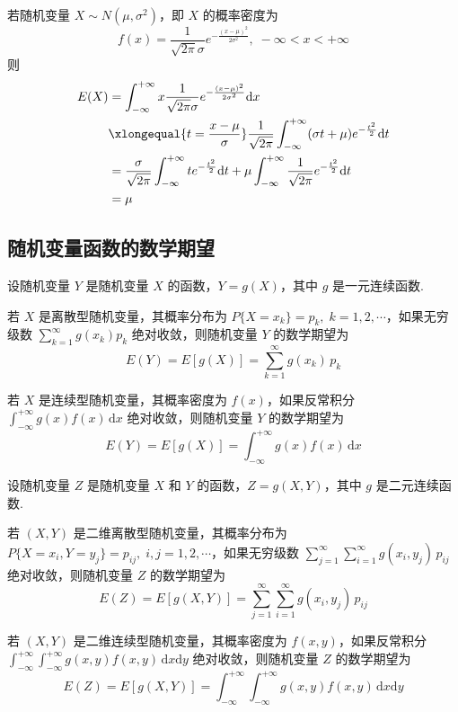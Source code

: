 若随机变量 $X \sim N(\mu,\sigma^2)$，即 $X$ 的概率密度为
$$
f(x) = \dfrac{1}{\sqrt{2 \pi} \sigma} e^{-\frac{(x-\mu)^2}{2 \sigma^2}}, \; -\infty < x < +\infty
$$
则
$$
\begin{aligned}
    E(X) &= \int_{-\infty}^{+\infty} x \dfrac{1}{\sqrt{2 \pi} \sigma} e^{-\frac{(x-\mu)^2}{2 \sigma^2}} \text{d}x \\
    & \xlongequal{t = \frac{x-\mu}{\sigma}} \dfrac{1}{\sqrt{2 \pi}} \int_{-\infty}^{+\infty} (\sigma t + \mu) e^{-\frac{t^2}{2}} \text{d}t \\
    &= \dfrac{\sigma}{\sqrt{2 \pi}} \int_{-\infty}^{+\infty} te^{-\frac{t^2}{2}} \text{d}t + \mu \int_{-\infty}^{+\infty} \dfrac{1}{\sqrt{2 \pi}} e^{-\frac{t^2}{2}} \text{d}t \\
    &= \mu
\end{aligned}
$$

\subsection{随机变量函数的数学期望}

\begin{theorem}
    设随机变量 $Y$ 是随机变量 $X$ 的函数，$Y=g(X)$，其中 $g$ 是一元连续函数.

    若 $X$ 是离散型随机变量，其概率分布为 $P\{X=x_k\} = p_k, \; k=1,2,\cdots$，如果无穷级数 $\displaystyle\sum_{k=1}^{\infty} g(x_k) p_k$ 绝对收敛，则随机变量 $Y$ 的数学期望为
    $$
    E(Y) = E[g(X)] = \sum_{k=1}^{\infty} g(x_k) \, p_k
    $$

    若 $X$ 是连续型随机变量，其概率密度为 $f(x)$，如果反常积分 $\displaystyle\int_{-\infty}^{+\infty} g(x) f(x) \, \text{d}x$ 绝对收敛，则随机变量 $Y$ 的数学期望为
    $$
    E(Y) = E[g(X)] = \int_{-\infty}^{+\infty} g(x) f(x) \, \text{d}x
    $$
\end{theorem}

\begin{theorem}
    设随机变量 $Z$ 是随机变量 $X$ 和 $Y$ 的函数，$Z=g(X,Y)$，其中 $g$ 是二元连续函数.

    若 $(X,Y)$ 是二维离散型随机变量，其概率分布为 $P\{X=x_i,Y=y_j\} = p_{ij}, \; i,j=1,2,\cdots$，如果无穷级数 $\displaystyle\sum_{j=1}^{\infty} \displaystyle\sum_{i=1}^{\infty} g(x_i,y_j) \, p_{ij}$ 绝对收敛，则随机变量 $Z$ 的数学期望为
    $$
    E(Z) = E[g(X,Y)] = \sum_{j=1}^{\infty} \sum_{i=1}^{\infty} g(x_i,y_j) \, p_{ij}
    $$

    若 $(X,Y)$ 是二维连续型随机变量，其概率密度为 $f(x,y)$，如果反常积分 $\displaystyle\int_{-\infty}^{+\infty} \displaystyle\int_{-\infty}^{+\infty} g(x,y) f(x,y) \, \text{d}x \text{d}y$ 绝对收敛，则随机变量 $Z$ 的数学期望为
    $$
    E(Z) = E[g(X,Y)] = \int_{-\infty}^{+\infty} \int_{-\infty}^{+\infty} g(x,y) f(x,y) \, \text{d}x \text{d}y
    $$
\end{theorem}

